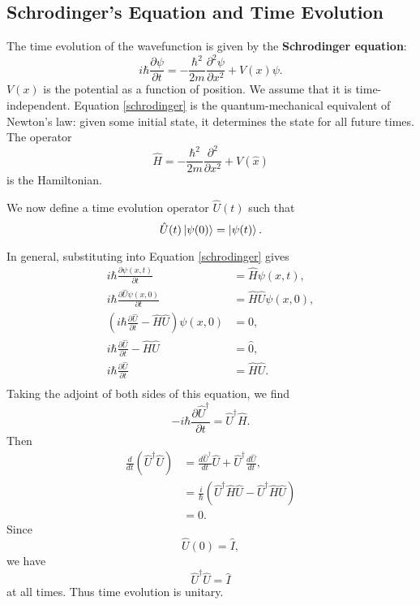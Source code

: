 \subsection{Schrodinger's Equation and Time Evolution}
The time evolution of the wavefunction is given by the \textbf{Schrodinger equation}:
\begin{equation}
\label{schrodinger}
i \hbar \frac{\partial \psi}{\partial t} = -\frac{\hbar^2}{2m} \frac{\partial^2 \psi}{\partial x^2} + V(x) \psi.
\end{equation}
$V(x)$ is the potential as a function of position. We assume that it is time-independent. Equation \ref{schrodinger} is the quantum-mechanical equivalent of Newton's law: given some initial state, it determines the state for all future times. The operator 
\begin{equation}
\hat{H} =  -\frac{\hbar^2}{2m} \frac{\partial^2 }{\partial x^2} + V(\hat{x})
\label{hamiltonian}
\end{equation}
is the Hamiltonian.

We now define a time evolution operator $\hat{U} (t)$ such that 
\begin{equation*}
\hat{U} (t) \left| \psi (0) \right\rangle = \left| \psi(t) \right\rangle.
\end{equation*} 

In general, substituting into Equation \ref{schrodinger} gives 
\begin{align*}
i \hbar \frac{\partial \psi (x,t)}{\partial t} &= \hat{H} \psi (x,t),\\
i \hbar \frac{\partial \hat{U} \psi (x,0)}{\partial t} &= \hat{H}\hat{U} \psi (x,0),\\
\left(i\hbar\frac{\partial \hat{U}}{\partial t} - \hat{H}\hat{U} \right) \psi (x,0) &= 0,\\
i\hbar\frac{\partial \hat{U}}{\partial t} - \hat{H}\hat{U} &= \hat{0}, \\
i\hbar \frac{\partial \hat{U}}{\partial t} &= \hat{H}\hat{U}. \\
\end{align*}
Taking the adjoint of both sides of this equation, we find
\begin{equation*}
-i\hbar \frac{\partial \hat{U}^{\dagger}}{\partial t} = \hat{U}^{\dagger} \hat{H}.
\end{equation*}
Then 
\begin{align*}
\frac{d}{dt} (\hat{U}^{\dagger}\hat{U}) &= \frac{d\hat{U}^{\dagger}}{dt}\hat{U} + \hat{U}^{\dagger} \frac{d\hat{U}}{dt}, \\
&= \frac{i}{\hbar} \left(\hat{U}^{\dagger} \hat{H} \hat{U} - \hat{U}^{\dagger} \hat{H} \hat{U} \right) \\
&= 0.
\end{align*}
Since 
\begin{equation*}
\hat{U}(0) = \hat{I},
\end{equation*}
we have
\begin{equation}
\hat{U}^{\dagger}\hat{U} = \hat{I}
\end{equation}
at all times. Thus time evolution is unitary.

